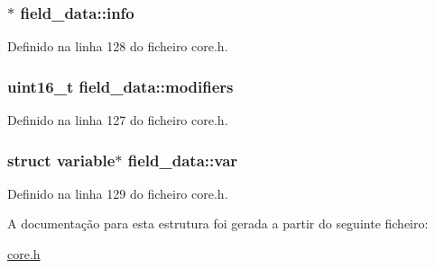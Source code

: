 \hypertarget{structfield__data_a216ebce6db98d903a6b50554a40459a9}{
\subsubsection[{info}]{$\ast$ field\-\_\-data\-::info}}\label{structfield__data_a216ebce6db98d903a6b50554a40459a9}


Definido na linha 128 do ficheiro core.\-h.

\hypertarget{structfield__data_a5d98375dcb4b589355eaf0c96a15eb12}{
\subsubsection[{modifiers}]{\setlength{\rightskip}{0pt plus 5cm}uint16\-\_\-t field\-\_\-data\-::modifiers}}\label{structfield__data_a5d98375dcb4b589355eaf0c96a15eb12}


Definido na linha 127 do ficheiro core.\-h.

\hypertarget{structfield__data_a6eb4ec12db5dba2140fff01c6d0439f8}{
\subsubsection[{var}]{\setlength{\rightskip}{0pt plus 5cm}struct {\bf variable}$\ast$ field\-\_\-data\-::var}}\label{structfield__data_a6eb4ec12db5dba2140fff01c6d0439f8}


Definido na linha 129 do ficheiro core.\-h.



A documentação para esta estrutura foi gerada a partir do seguinte ficheiro\-:\begin{DoxyCompactItemize}
\item 
\hyperlink{core_8h}{core.\-h}\end{DoxyCompactItemize}

